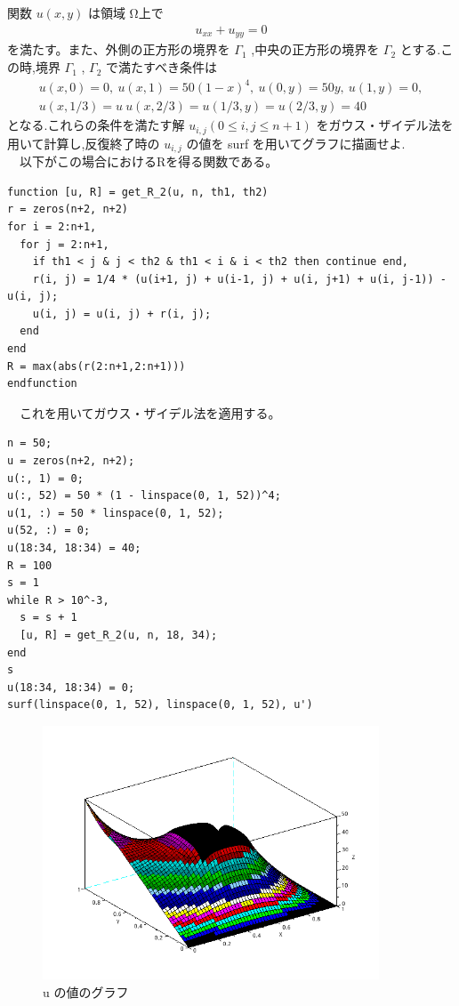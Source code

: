 \documentclass{scrartcl}
\begin{document}
\subsection{}
\label{sec:org1844e6c}
関数 \(u(x, y)\) は領域 Ω上で\\
\begin{eqnarray*}
u_{xx} + u_{yy} = 0
\end{eqnarray*}
  を満たす。また、外側の正方形の境界を \(\Gamma_1\) ,中央の正方形の境界を \(\Gamma_2\) とする.こ\\
の時,境界 \(\Gamma_1\) , \(\Gamma_2\) で満たすべき条件は\\
\begin{eqnarray*}
u(x, 0) = 0,\ u(x, 1) = 50(1-x)^4 ,\ u(0, y) = 50y,\ u(1, y) = 0, \\
u(x, 1/3) = u \ u(x, 2/3) = u(1/3, y) = u(2/3, y) = 40\ 
\end{eqnarray*}
となる.これらの条件を満たす解 \(u_{i,j} (0 \leq i, j \leq n + 1)\) をガウス・ザイデル法を用いて計算し,反復終了時の \(u_{i,j}\) の値を surf を用いてグラフに描画せよ. \\
　以下がこの場合におけるRを得る関数である。\\
\begin{verbatim}
function [u, R] = get_R_2(u, n, th1, th2)
r = zeros(n+2, n+2)
for i = 2:n+1,
  for j = 2:n+1,
    if th1 < j & j < th2 & th1 < i & i < th2 then continue end, 
    r(i, j) = 1/4 * (u(i+1, j) + u(i-1, j) + u(i, j+1) + u(i, j-1)) - u(i, j);
    u(i, j) = u(i, j) + r(i, j);
  end
end
R = max(abs(r(2:n+1,2:n+1)))
endfunction
\end{verbatim}
　これを用いてガウス・ザイデル法を適用する。\\
\begin{verbatim}
n = 50;
u = zeros(n+2, n+2);
u(:, 1) = 0;
u(:, 52) = 50 * (1 - linspace(0, 1, 52))^4;
u(1, :) = 50 * linspace(0, 1, 52);
u(52, :) = 0;
u(18:34, 18:34) = 40;
R = 100
s = 1
while R > 10^-3,
  s = s + 1
  [u, R] = get_R_2(u, n, 18, 34);
end
s
u(18:34, 18:34) = 0;
surf(linspace(0, 1, 52), linspace(0, 1, 52), u')   
\end{verbatim}
\begin{figure}[htbp]
\centering
\includegraphics[width=10cm]{./2-2.png}
\caption{u の値のグラフ}
\end{figure}
\end{document}
